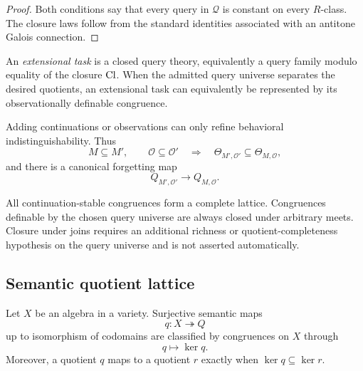 \begin{proof}
Both conditions say that every query in \(\mathcal Q\) is constant on every \(R\)-class.  The closure laws follow from the standard identities associated with an antitone Galois connection.
\end{proof}

\begin{definition}
\label{def:block17-extensional-task}
An \emph{extensional task} is a closed query theory, equivalently a query family modulo equality of the closure \(\operatorname{Cl}\).  When the admitted query universe separates the desired quotients, an extensional task can equivalently be represented by its observationally definable congruence.
\end{definition}

\begin{corollary}
\label{cor:block17-task-strengthening}
Adding continuations or observations can only refine behavioral indistinguishability.  Thus
\[
 M\subseteq M',\qquad \mathcal O\subseteq\mathcal O'
 \quad\Longrightarrow\quad
 \Theta_{M',\mathcal O'}\subseteq\Theta_{M,\mathcal O},
\]
and there is a canonical forgetting map
\[
 Q_{M',\mathcal O'}\longrightarrow Q_{M,\mathcal O}.
\]
\end{corollary}

\begin{boundary}
\label{bnd:block17-task-lattice}
All continuation-stable congruences form a complete lattice.  Congruences definable by the chosen query universe are always closed under arbitrary meets.  Closure under joins requires an additional richness or quotient-completeness hypothesis on the query universe and is not asserted automatically.
\end{boundary}

\subsection{Semantic quotient lattice}
\label{subsec:block17-quotient-lattice}

\begin{theorem}
\label{thm:block17-semantic-quotient-classification}
Let \(X\) be an algebra in a variety.  Surjective semantic maps
\[
 q:X\twoheadrightarrow Q
\]
up to isomorphism of codomains are classified by congruences on \(X\) through
\[
 q\longmapsto\ker q.
\]
Moreover, a quotient \(q\) maps to a quotient \(r\) exactly when \(\ker q\subseteq\ker r\).
\end{theorem}

